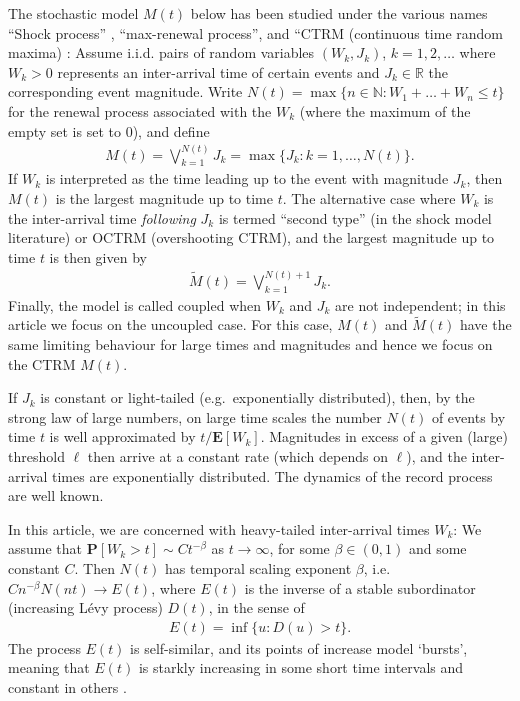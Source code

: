 \documentclass[12pt]{amsart}
\theoremstyle{definition}
\theoremstyle{remark}
\numberwithin{equation}{section}
\newcommand{\ex}{\mathbf {E}}
\newcommand{\pr}{\mathbf {P}}
\newcommand{\R}{\mathbb R}
\newcommand{\1}{\mathbf 1}
\begin{document}
The stochastic model $M(t)$ below has been studied under the various names
``Shock process''
\cite{Esary1973,Sumita1983,Sumita1984,Sumita1985,Anderson1987,Gut1999}, 
``max-renewal process'', 
\cite{Silvestrov2002a,ST04,Basrak2014}
and ``CTRM (continuous time random maxima)
\cite{Benson2007,Meerschaert2009,Hees16,Hees2015}: 
Assume i.i.d. pairs of random variables $(W_k, J_k)$, $k = 1, 2, \ldots$
where $W_k > 0$ represents an inter-arrival time of certain events and 
$J_k \in \R$ the corresponding event magnitude.  
Write $N(t) = \max\{n \in \mathbb N: W_1 + \ldots + W_n \le t\}$ for the renewal process
associated with the $W_k$ (where the maximum of the empty set is set to $0$), 
and define
\begin{align}
M(t) = \bigvee_{k=1}^{N(t)} J_k
= \max\{J_k: k = 1, \ldots, N(t)\}.
\end{align}
If $W_k$ is interpreted as the time leading up to the event with magnitude
$J_k$, then $M(t)$ is the largest magnitude up to time $t$.
The alternative case where $W_k$ is the inter-arrival time \textit{following} $J_k$ 
is termed ``second type'' (in the shock model literature) or OCTRM
(overshooting CTRM), and the largest magnitude up to time $t$ is then
given by
\begin{align}
\tilde M(t) = \bigvee_{k=1}^{N(t)+1} J_k.
\end{align}
Finally, the model is called coupled when $W_k$ and $J_k$ are not independent;
in this article we focus on the uncoupled case.  For this case, $M(t)$ and
$\tilde M(t)$ have the same limiting behaviour for large times and magnitudes
\cite{Hees2015} and hence we focus on the CTRM $M(t)$. 

If $J_k$ is constant or light-tailed (e.g.\ exponentially distributed), 
then, by the strong law of large numbers,
on large time scales the number $N(t)$ of events by time $t$ is well
approximated by $t/\ex[W_k]$. Magnitudes in excess of a given (large)
threshold $\ell$ then arrive at a constant rate (which depends on $\ell$), 
and the inter-arrival times are exponentially distributed. 
The dynamics of the record process are well known.

In this article, we are concerned with heavy-tailed inter-arrival times $W_k$: 
We assume that $\pr[W_k > t] \sim C t^{-\beta}$ as $t \to \infty$, 
for some $\beta \in (0,1)$ and some constant $C$. 
Then $N(t)$ has temporal scaling exponent $\beta$, i.e.\
$C n^{-\beta} N(nt) \to E(t)$, where 
$E(t)$ is the inverse of a stable subordinator
(increasing L\'evy process) $D(t)$, in the sense of 
\begin{align}
E(t) = \inf\{u: D(u) > t\}.
\end{align}
The process $E(t)$ is self-similar, and its points of increase model `bursts',
meaning that $E(t)$ is starkly increasing in some short time intervals and
constant in others \cite{Karsai2012}.
\end{document}
